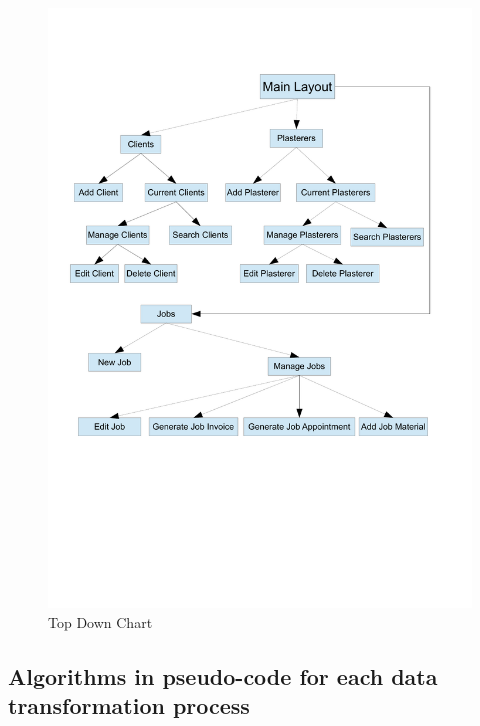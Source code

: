 \begin{figure}[H]
\includegraphics[scale=0.4]{./Design/images/TopDownChart.pdf}
    \caption{Top Down Chart} 
\label{fig:FlowChartNewClient}
\end{figure}






\pagebreak
\subsection{Algorithms in pseudo-code for each data transformation process}

